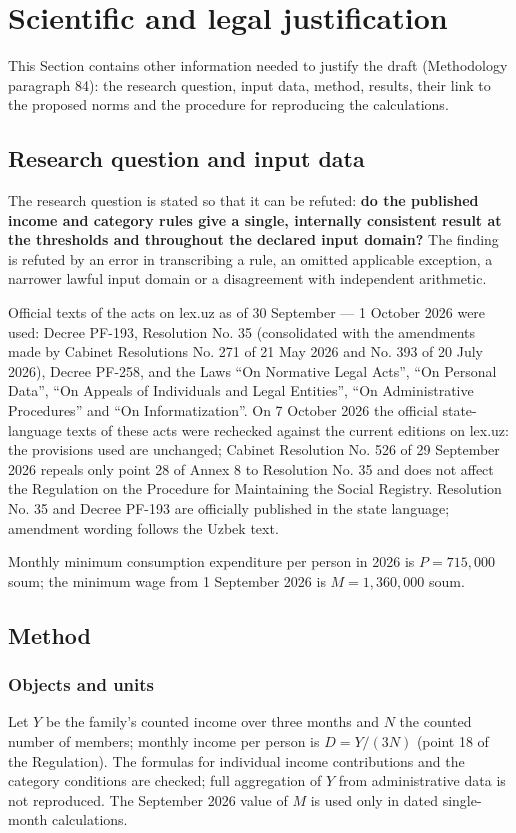\documentclass[14pt,a4paper]{extarticle}
\begin{document}
\section{Scientific and legal justification}\label{sec:sci}
This Section contains other information needed to justify the draft (Methodology paragraph 84): the research question, input data, method, results, their link to the proposed norms and the procedure for reproducing the calculations.

\subsection{Research question and input data}
The research question is stated so that it can be refuted: \textbf{do the published income and category rules give a single, internally consistent result at the thresholds and throughout the declared input domain?} The finding is refuted by an error in transcribing a rule, an omitted applicable exception, a narrower lawful input domain or a disagreement with independent arithmetic.

Official texts of the acts on lex.uz as of 30 September — 1 October 2026 were used: Decree PF-193, Resolution No. 35 (consolidated with the amendments made by Cabinet Resolutions No. 271 of 21 May 2026 and No. 393 of 20 July 2026), Decree PF-258, and the Laws “On Normative Legal Acts”, “On Personal Data”, “On Appeals of Individuals and Legal Entities”, “On Administrative Procedures” and “On Informatization”\cite{pf193,res35,pf258,orq682,pdlaw,appeals,apl,inform}. On 7 October 2026 the official state-language texts of these acts were rechecked against the current editions on lex.uz: the provisions used are unchanged; Cabinet Resolution No. 526 of 29 September 2026 repeals only point 28 of Annex 8 to Resolution No. 35 and does not affect the Regulation on the Procedure for Maintaining the Social Registry. Resolution No. 35 and Decree PF-193 are officially published in the state language; amendment wording follows the Uzbek text.

Monthly minimum consumption expenditure per person in 2026 is $P=715{,}000$ soum\cite{mpr}; the minimum wage from 1 September 2026 is $M=1{,}360{,}000$ soum\cite{mrot}.

\subsection{Method}
\subsubsection{Objects and units}
Let $Y$ be the family’s counted income over three months and $N$ the counted number of members; monthly income per person is $D=Y/(3N)$ (point 18 of the Regulation). The formulas for individual income contributions and the category conditions are checked; full aggregation of $Y$ from administrative data is not reproduced. The September 2026 value of $M$ is used only in dated single-month calculations.
\end{document}
